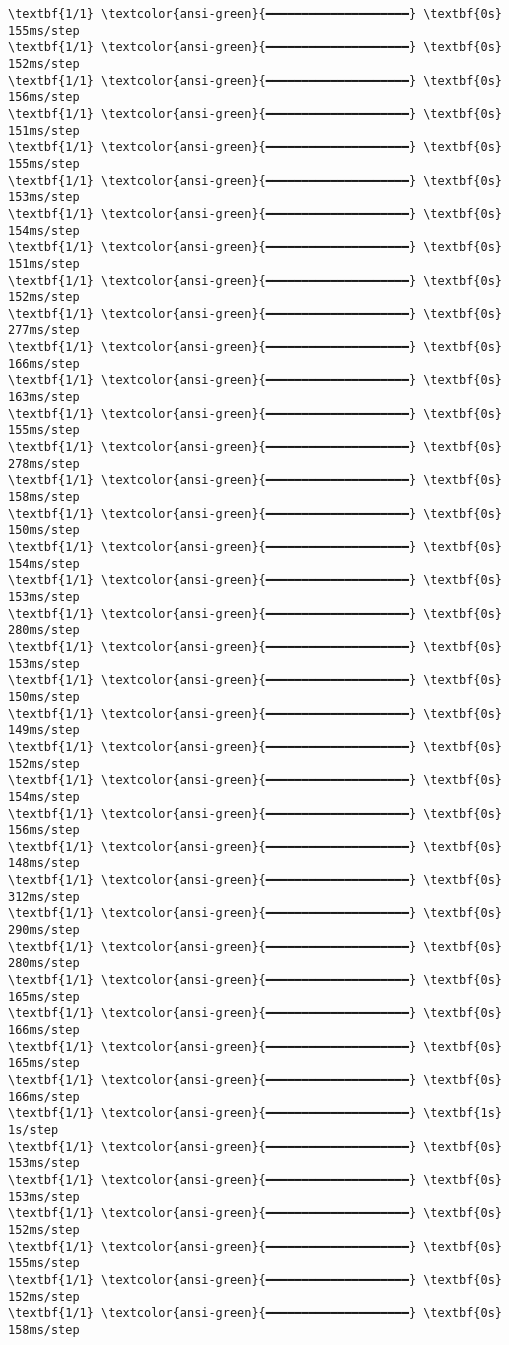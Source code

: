 \documentclass[11pt]{article}
\begin{document}
\begin{Verbatim}[commandchars=\\\{\}]
\textbf{1/1} \textcolor{ansi-green}{━━━━━━━━━━━━━━━━━━━━} \textbf{0s} 155ms/step
\textbf{1/1} \textcolor{ansi-green}{━━━━━━━━━━━━━━━━━━━━} \textbf{0s} 152ms/step
\textbf{1/1} \textcolor{ansi-green}{━━━━━━━━━━━━━━━━━━━━} \textbf{0s} 156ms/step
\textbf{1/1} \textcolor{ansi-green}{━━━━━━━━━━━━━━━━━━━━} \textbf{0s} 151ms/step
\textbf{1/1} \textcolor{ansi-green}{━━━━━━━━━━━━━━━━━━━━} \textbf{0s} 155ms/step
\textbf{1/1} \textcolor{ansi-green}{━━━━━━━━━━━━━━━━━━━━} \textbf{0s} 153ms/step
\textbf{1/1} \textcolor{ansi-green}{━━━━━━━━━━━━━━━━━━━━} \textbf{0s} 154ms/step
\textbf{1/1} \textcolor{ansi-green}{━━━━━━━━━━━━━━━━━━━━} \textbf{0s} 151ms/step
\textbf{1/1} \textcolor{ansi-green}{━━━━━━━━━━━━━━━━━━━━} \textbf{0s} 152ms/step
\textbf{1/1} \textcolor{ansi-green}{━━━━━━━━━━━━━━━━━━━━} \textbf{0s} 277ms/step
\textbf{1/1} \textcolor{ansi-green}{━━━━━━━━━━━━━━━━━━━━} \textbf{0s} 166ms/step
\textbf{1/1} \textcolor{ansi-green}{━━━━━━━━━━━━━━━━━━━━} \textbf{0s} 163ms/step
\textbf{1/1} \textcolor{ansi-green}{━━━━━━━━━━━━━━━━━━━━} \textbf{0s} 155ms/step
\textbf{1/1} \textcolor{ansi-green}{━━━━━━━━━━━━━━━━━━━━} \textbf{0s} 278ms/step
\textbf{1/1} \textcolor{ansi-green}{━━━━━━━━━━━━━━━━━━━━} \textbf{0s} 158ms/step
\textbf{1/1} \textcolor{ansi-green}{━━━━━━━━━━━━━━━━━━━━} \textbf{0s} 150ms/step
\textbf{1/1} \textcolor{ansi-green}{━━━━━━━━━━━━━━━━━━━━} \textbf{0s} 154ms/step
\textbf{1/1} \textcolor{ansi-green}{━━━━━━━━━━━━━━━━━━━━} \textbf{0s} 153ms/step
\textbf{1/1} \textcolor{ansi-green}{━━━━━━━━━━━━━━━━━━━━} \textbf{0s} 280ms/step
\textbf{1/1} \textcolor{ansi-green}{━━━━━━━━━━━━━━━━━━━━} \textbf{0s} 153ms/step
\textbf{1/1} \textcolor{ansi-green}{━━━━━━━━━━━━━━━━━━━━} \textbf{0s} 150ms/step
\textbf{1/1} \textcolor{ansi-green}{━━━━━━━━━━━━━━━━━━━━} \textbf{0s} 149ms/step
\textbf{1/1} \textcolor{ansi-green}{━━━━━━━━━━━━━━━━━━━━} \textbf{0s} 152ms/step
\textbf{1/1} \textcolor{ansi-green}{━━━━━━━━━━━━━━━━━━━━} \textbf{0s} 154ms/step
\textbf{1/1} \textcolor{ansi-green}{━━━━━━━━━━━━━━━━━━━━} \textbf{0s} 156ms/step
\textbf{1/1} \textcolor{ansi-green}{━━━━━━━━━━━━━━━━━━━━} \textbf{0s} 148ms/step
\textbf{1/1} \textcolor{ansi-green}{━━━━━━━━━━━━━━━━━━━━} \textbf{0s} 312ms/step
\textbf{1/1} \textcolor{ansi-green}{━━━━━━━━━━━━━━━━━━━━} \textbf{0s} 290ms/step
\textbf{1/1} \textcolor{ansi-green}{━━━━━━━━━━━━━━━━━━━━} \textbf{0s} 280ms/step
\textbf{1/1} \textcolor{ansi-green}{━━━━━━━━━━━━━━━━━━━━} \textbf{0s} 165ms/step
\textbf{1/1} \textcolor{ansi-green}{━━━━━━━━━━━━━━━━━━━━} \textbf{0s} 166ms/step
\textbf{1/1} \textcolor{ansi-green}{━━━━━━━━━━━━━━━━━━━━} \textbf{0s} 165ms/step
\textbf{1/1} \textcolor{ansi-green}{━━━━━━━━━━━━━━━━━━━━} \textbf{0s} 166ms/step
\textbf{1/1} \textcolor{ansi-green}{━━━━━━━━━━━━━━━━━━━━} \textbf{1s} 1s/step
\textbf{1/1} \textcolor{ansi-green}{━━━━━━━━━━━━━━━━━━━━} \textbf{0s} 153ms/step
\textbf{1/1} \textcolor{ansi-green}{━━━━━━━━━━━━━━━━━━━━} \textbf{0s} 153ms/step
\textbf{1/1} \textcolor{ansi-green}{━━━━━━━━━━━━━━━━━━━━} \textbf{0s} 152ms/step
\textbf{1/1} \textcolor{ansi-green}{━━━━━━━━━━━━━━━━━━━━} \textbf{0s} 155ms/step
\textbf{1/1} \textcolor{ansi-green}{━━━━━━━━━━━━━━━━━━━━} \textbf{0s} 152ms/step
\textbf{1/1} \textcolor{ansi-green}{━━━━━━━━━━━━━━━━━━━━} \textbf{0s} 158ms/step
    \end{Verbatim}


    
    
    
\end{document}
